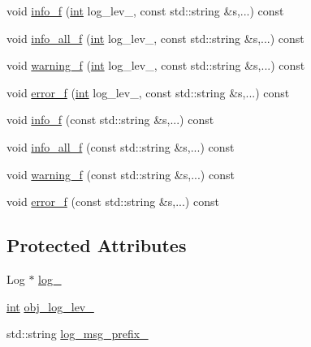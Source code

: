 \begin{DoxyCompactItemize}
\item 
void \hyperlink{classutils_1_1logged__obj__base_a72f3597347a6b7290829ea40383706aa}{info\-\_\-f} (\hyperlink{classint}{int} log\-\_\-lev\-\_\-, const std\-::string \&s,...) const 
\item 
void \hyperlink{classutils_1_1logged__obj__base_a2cbedf2778c0ec4d142ba57ea0d60716}{info\-\_\-all\-\_\-f} (\hyperlink{classint}{int} log\-\_\-lev\-\_\-, const std\-::string \&s,...) const 
\item 
void \hyperlink{classutils_1_1logged__obj__base_ae8698217614c4651f7081ad91f5faedc}{warning\-\_\-f} (\hyperlink{classint}{int} log\-\_\-lev\-\_\-, const std\-::string \&s,...) const 
\item 
void \hyperlink{classutils_1_1logged__obj__base_a3ec2af773b896a887e60490462ce99bd}{error\-\_\-f} (\hyperlink{classint}{int} log\-\_\-lev\-\_\-, const std\-::string \&s,...) const 
\item 
void \hyperlink{classutils_1_1logged__obj__base_a4eae523d66a6aa97ca43cbab871634f6}{info\-\_\-f} (const std\-::string \&s,...) const 
\item 
void \hyperlink{classutils_1_1logged__obj__base_a15be1ccccf0aa82e2368cf39c3603662}{info\-\_\-all\-\_\-f} (const std\-::string \&s,...) const 
\item 
void \hyperlink{classutils_1_1logged__obj__base_a9f0097f51f2f8757b96fc7f261b6878d}{warning\-\_\-f} (const std\-::string \&s,...) const 
\item 
void \hyperlink{classutils_1_1logged__obj__base_a02e4238bd54682584c2b0063bb973de0}{error\-\_\-f} (const std\-::string \&s,...) const 
\end{DoxyCompactItemize}
\subsection*{Protected Attributes}
\begin{DoxyCompactItemize}
\item 
Log $\ast$ \hyperlink{classutils_1_1logged__obj__base_a8dedfdc5d7ab2e5aaed5e24797e51977}{log\-\_\-}
\item 
\hyperlink{classint}{int} \hyperlink{classutils_1_1logged__obj__base_a3723877fed12d62835b9d19c9eec49ec}{obj\-\_\-log\-\_\-lev\-\_\-}
\item 
std\-::string \hyperlink{classutils_1_1logged__obj__base_a00f8823833fdda5f000de5178e642a95}{log\-\_\-msg\-\_\-prefix\-\_\-}
\end{DoxyCompactItemize}


